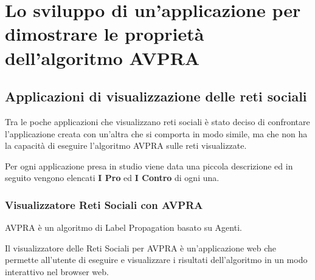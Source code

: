 \documentclass[a4paper,12pt]{report}
\begin{document}
\chapter[Lo sviluppo dell'applicazione]{Lo sviluppo di un'applicazione per dimostrare le proprietà dell'algoritmo AVPRA}

	\section{Applicazioni di visualizzazione delle reti sociali}
		Tra le poche applicazioni che visualizzano reti sociali è stato deciso di confrontare l'applicazione creata con un'altra che si comporta in modo simile, ma che non ha la capacità di eseguire l'algoritmo AVPRA sulle reti visualizzate.

		Per ogni applicazione presa in studio viene data una piccola descrizione ed in seguito vengono elencati \textbf{I Pro} ed \textbf{I Contro} di ogni una.

		\subsection{Visualizzatore Reti Sociali con AVPRA}
		AVPRA è un algoritmo di Label Propagation basato su Agenti.
		
		Il visualizzatore delle Reti Sociali per AVPRA è un'applicazione web che permette all'utente di
		eseguire e visualizzare i risultati dell'algoritmo in un modo interattivo nel browser web.
		
\end{document}
